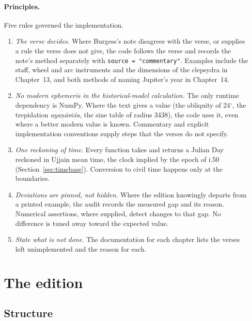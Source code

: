 \documentclass[11pt,a4paper]{article}
\begin{document}
\paragraph{Principles.} Five rules governed the implementation.
\begin{enumerate}
  \item[\textbf{P1}] \emph{The verse decides.} Where Burgess's note disagrees with the verse, or supplies a rule the verse does not give, the code follows the verse and records the note's method separately with \texttt{source = "commentary"}. Examples include the staff, wheel and arc instruments and the dimensions of the clepsydra in Chapter~13, and both methods of naming Jupiter's year in Chapter~14.
  \item[\textbf{P2}] \emph{No modern ephemeris in the historical-model calculation.} The only runtime dependency is NumPy. Where the text gives a value (the obliquity of 24$^\circ$, the trepidation \textit{aya\d{n}\=a\.m\'sa}, the sine table of radius 3438), the code uses it, even where a better modern value is known. Commentary and explicit implementation conventions supply steps that the verses do not specify.
  \item[\textbf{P3}] \emph{One reckoning of time.} Every function takes and returns a Julian Day reckoned in Ujjain mean time, the clock implied by the epoch of i.50 (Section~\ref{sec:timebase}). Conversion to civil time happens only at the boundaries.
  \item[\textbf{P4}] \emph{Deviations are pinned, not hidden.} Where the edition knowingly departs from a printed example, the audit records the measured gap and its reason. Numerical assertions, where supplied, detect changes to that gap. No difference is tuned away toward the expected value.
  \item[\textbf{P5}] \emph{State what is not done.} The documentation for each chapter lists the verses left unimplemented and the reason for each.
\end{enumerate}

\section{The edition}
\label{sec:edition}

\subsection{Structure}
\end{document}
